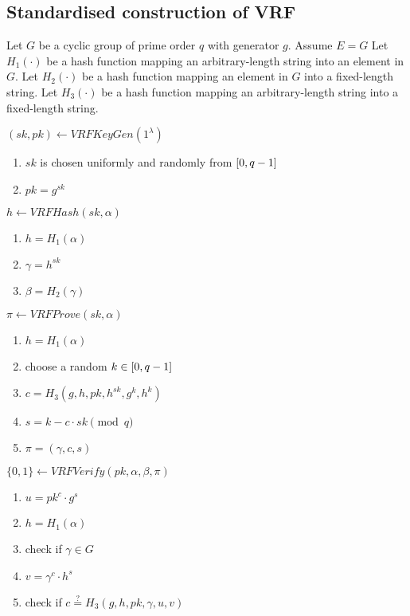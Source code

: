 \subsection{Standardised construction of VRF}

Let $G$ be a cyclic group of prime order $q$ with generator $g$. Assume $E = G$
Let $H_1(\cdot)$ be a hash function mapping an arbitrary-length string into an element in $G$.
Let $H_2(\cdot)$ be a hash function mapping an element in $G$ into a fixed-length string.
Let $H_3(\cdot)$ be a hash function mapping an arbitrary-length string into a fixed-length string.

$(sk, pk) \leftarrow VRFKeyGen(1^{\lambda})$
\begin{enumerate}
    \item $sk$ is chosen uniformly and randomly from $\interval{0}{q-1}$
    \item $pk = g^{sk}$
\end{enumerate}

$h \leftarrow VRFHash(sk, \alpha)$
\begin{enumerate}
    \item $h = H_{1}(\alpha)$
    \item $\gamma = h^{sk}$
    \item $\beta = H_{2}(\gamma)$
\end{enumerate}

$\pi \leftarrow VRFProve(sk, \alpha)$
\begin{enumerate}
    \item $h = H_{1}(\alpha)$
    \item choose a random $k \in \interval{0}{q-1}$
    \item $c = H_{3}(g, h, pk, h^{sk}, g^{k}, h^{k})$
    \item $s = k - c \cdot sk \pmod{q}$
    \item $\pi = (\gamma, c, s)$
\end{enumerate}

$\{0, 1\} \leftarrow VRFVerify(pk, \alpha, \beta, \pi)$
\begin{enumerate}
    \item $u = pk^{c} \cdot g^{s}$
    \item $h = H_{1}(\alpha)$
    \item check if $\gamma \in G$
    \item $v = \gamma^{c} \cdot h^{s}$
    \item check if $c \stackrel{?}{=} H_{3}(g, h, pk, \gamma, u, v)$
\end{enumerate}
